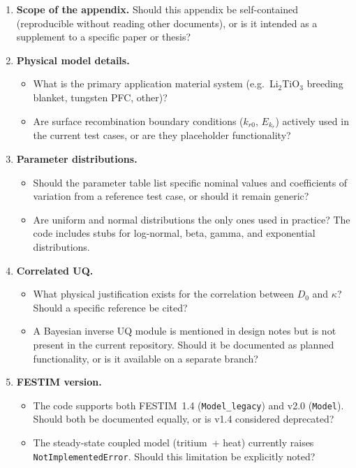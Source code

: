 \documentclass[11pt,a4paper]{article}
\begin{document}
\begin{enumerate}
  \item \textbf{Scope of the appendix.}  Should this appendix be
    self-contained (reproducible without reading other documents), or is
    it intended as a supplement to a specific paper or thesis?

  \item \textbf{Physical model details.}
    \begin{itemize}[nosep]
      \item What is the primary application material system
            (e.g.\ Li$_2$TiO$_3$ breeding blanket, tungsten PFC, other)?
      \item Are surface recombination boundary conditions ($k_{r0}$,
            $E_{k_r}$) actively used in the current test cases, or are
            they placeholder functionality?
    \end{itemize}

  \item \textbf{Parameter distributions.}
    \begin{itemize}[nosep]
      \item Should the parameter table list specific nominal values and
            coefficients of variation from a reference test case, or
            should it remain generic?
      \item Are uniform and normal distributions the only ones used in
            practice?  The code includes stubs for log-normal, beta,
            gamma, and exponential distributions.
    \end{itemize}

  \item \textbf{Correlated UQ.}
    \begin{itemize}[nosep]
      \item What physical justification exists for the correlation between
            $D_0$ and $\kappa$?  Should a specific reference be cited?
      \item A Bayesian inverse UQ module is mentioned in design notes but
            is not present in the current repository.  Should it be
            documented as planned functionality, or is it available on a
            separate branch?
    \end{itemize}

  \item \textbf{FESTIM version.}
    \begin{itemize}[nosep]
      \item The code supports both FESTIM~1.4 (\texttt{Model\_legacy}) and
            v2.0 (\texttt{Model}).  Should both be documented equally, or
            is v1.4 considered deprecated?
      \item The steady-state coupled model (tritium~+ heat) currently raises
            \texttt{NotImplementedError}.  Should this limitation be
            explicitly noted?
    \end{itemize}


\end{enumerate}
\end{document}
